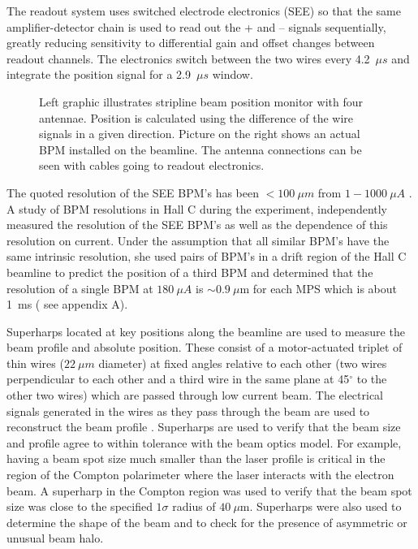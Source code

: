   The readout system uses switched electrode electronics (SEE) so that the same amplifier-detector chain is used to read out the + and -- signals sequentially, greatly reducing sensitivity to differential gain and offset changes between readout channels. The electronics switch between the two wires every 4.2~$\mu s$ and integrate the position signal for a 2.9~$\mu s$ window.
\begin{figure}[ht]
\centering
{}
\caption{Left graphic illustrates stripline beam position monitor with four antennae. Position is calculated using the difference of the wire signals in a given direction. Picture on the right shows an actual BPM installed on the beamline. The antenna connections can be seen with cables going to readout electronics.}
\label{fig:bpm_attennae}
\end{figure}

The quoted resolution of the SEE BPM's has been $<100~\mu m$ from $1-1000~\mu A$ \cite{Powers1997}. A study of BPM resolutions in Hall C during the \Qs experiment, independently measured the resolution of the SEE BPM's as well as the dependence of this resolution on current. Under the assumption that all similar BPM's have the same intrinsic resolution, she used pairs of BPM's in a drift region of the Hall C beamline to predict the position of a third BPM and determined that the resolution of a single BPM at $180~\mu A$ is $\sim 0.9~\mu$m for each MPS which is about 1~ms ( see \cite{Waidyawansa} appendix A).

Superharps located at key positions along the beamline are used to measure the beam profile and absolute position. These consist of a motor-actuated triplet of thin wires ($22~\mu m$ diameter) at fixed angles relative to each other (two wires perpendicular to each other and a third wire in the same plane at 45$^{\circ}$ to the other two wires) which are passed through low current beam. The electrical signals generated in the wires as they pass through the beam are used to reconstruct the beam profile \cite{Yan1995}. Superharps are used to verify that the beam size and profile agree to within tolerance with the beam optics model. For example, having a beam spot size much smaller than the laser profile is critical in the region of the Compton polarimeter where the laser interacts with the electron beam. A superharp in the Compton region was used to verify that the beam spot size was close to the specified $1\sigma$ radius of $40~\mu$m. Superharps were also used to determine the shape of the beam and to check for the presence of asymmetric or unusual beam halo.

